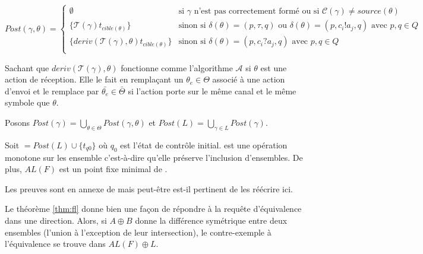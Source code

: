 $$
Post(\gamma,\theta) = \left\{ \begin{array}{ll}
    \emptyset & \text{si } \gamma \text{ n'est pas correctement formé ou si } \mathcal{C}(\gamma)\neq source(\theta)\\
    \{\mathcal{T}(\gamma)t_{cible(\theta)}\} & \text{sinon si }\delta(\theta)=(p,\tau,q) \text{ ou } \delta(\theta)=(p,c_i!a_j,q) \text{ avec }p,q\in Q\\
    \{deriv(\mathcal{T}(\gamma),\theta)t_{cible(\theta)}\}& \text{sinon si } \delta(\theta)=(p,c_i?a_j,q) \text{ avec }p,q\in Q \\
    \end{array} \right.
$$

Sachant que $deriv(\mathcal{T}(\gamma),\theta)$ fonctionne comme l'algorithme $\mathcal{A}$ si $\theta$ est une action de réception. Elle le fait en remplaçant un $\theta_e \in \Theta$ associé à une action d'envoi et le remplace par $\bar{\theta_e} \in \bar{\Theta}$ si l'action porte sur le même canal et le même symbole que $\theta$.

Posons $Post(\gamma)=\bigcup_{\theta\in\Theta}Post(\gamma,\theta)$ et $Post(L)=\bigcup_{\gamma\in L}Post(\gamma)$.


\begin{theorem}\label{thm:fl}
  Soit \fl$=Post(L)\cup\{t_{q0}\}$ où $q_0$ est l'état de contrôle initial. \fl est une opération monotone sur les ensemble c'est-à-dire qu'elle préserve l'inclusion d'ensembles. De plus, $AL(F)$ est un point fixe minimal de \fl.
\end{theorem}

Les preuves sont en annexe de \cite{Vardhan04} mais peut-être est-il pertinent de les réécrire ici. 

Le théorème \ref{thm:fl} donne bien une façon de répondre à la requête d'équivalence dans une direction. Alors, si $A\oplus B$ donne la différence symétrique entre deux ensembles (l'union à l'exception de leur intersection), le contre-exemple à l'équivalence se trouve dans $AL(F)\oplus L$.

